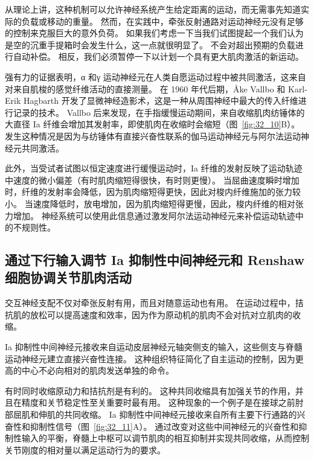 从理论上讲，这种机制可以允许神经系统产生给定距离的运动，而无需事先知道实际的负载或移动的重量。
然而，在实践中，牵张反射通路对运动神经元没有足够的控制来克服巨大的意外负荷。
如果我们考虑一下当我们试图提起一个我们认为是空的沉重手提箱时会发生什么，这一点就很明显了。
不会对超出预期的负载进行自动补偿。
相反，我们必须暂停一下以计划一个具有更大肌肉激活的新运动。


强有力的证据表明，α 和γ 运动神经元在人类自愿运动过程中被共同激活，这来自对来自肌梭的感觉纤维活动的直接测量。
在 1960 年代后期，Åke Vallbo 和 Karl-Erik Hagbarth 开发了显微神经造影术，这是一种从周围神经中最大的传入纤维进行记录的技术。
Vallbo 后来发现，在手指缓慢运动期间，来自收缩肌肉纺锤体的大直径 Ia 纤维会增加其发射率，即使肌肉在收缩时会缩短（图~\ref{fig:32_10}B）。
发生这种情况是因为与纺锤体有直接兴奋性联系的伽马运动神经元与阿尔法运动神经元共同激活。


此外，当受试者试图以恒定速度进行缓慢运动时，Ia 纤维的发射反映了运动轨迹中速度的微小偏差（有时肌肉缩短得很快，有时则更慢）。
当屈曲速度瞬时增加时，纤维的发射率会降低，因为肌肉缩短得更快，因此对梭内纤维施加的张力较小。
当速度降低时，放电增加，因为肌肉缩短得更慢，因此，梭内纤维的相对张力增加。
神经系统可以使用此信息通过激发阿尔法运动神经元来补偿运动轨迹中的不规则性。



\subsection{通过下行输入调节 Ia 抑制性中间神经元和 Renshaw 细胞协调关节肌肉活动}

交互神经支配不仅对牵张反射有用，而且对随意运动也有用。
在运动过程中，拮抗肌的放松可以提高速度和效率，因为作为原动机的肌肉不会对抗对立肌肉的收缩。


Ia 抑制性中间神经元接收来自运动皮层神经元轴突侧支的输入，这些侧支与脊髓运动神经元建立直接兴奋性连接。
这种组织特征简化了自主运动的控制，因为更高的中心不必向相对的肌肉发送单独的命令。


有时同时收缩原动力和拮抗剂是有利的。
这种共同收缩具有加强关节的作用，并且在精度和关节稳定性至关重要时最有用。
这种现象的一个例子是在接球之前肘部屈肌和伸肌的共同收缩。
Ia 抑制性中间神经元接收来自所有主要下行通路的兴奋性和抑制性信号（图~\ref{fig:32_11}A）。
通过改变对这些中间神经元的兴奋性和抑制性输入的平衡，脊髓上中枢可以调节肌肉的相互抑制并实现共同收缩，从而控制关节刚度的相对量以满足运动行为的要求。



